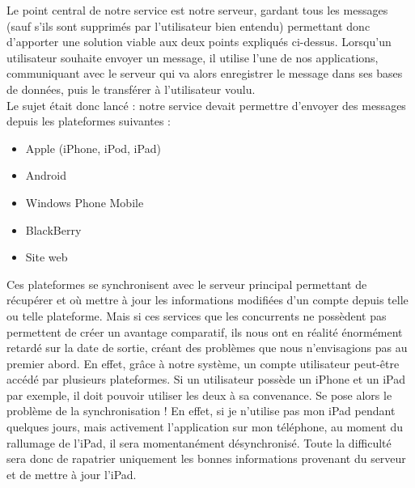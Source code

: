 \documentclass{article}
\begin{document}
Le point central de notre service est notre serveur, gardant tous les messages (sauf s’ils sont supprimés par l’utilisateur bien entendu) permettant donc d’apporter une solution viable aux deux points expliqués ci-dessus. Lorsqu'un utilisateur souhaite envoyer un message, il utilise l'une de nos applications, communiquant avec le serveur qui va alors enregistrer le message dans ses bases de données, puis le transférer à l'utilisateur voulu. \\
	
Le sujet était donc lancé : notre service devait permettre d’envoyer des messages depuis les plateformes suivantes :
	\begin{itemize}
		\item Apple (iPhone, iPod, iPad)
		\item Android
		\item Windows Phone Mobile
		\item BlackBerry
		\item Site web
	\end{itemize}

Ces plateformes se synchronisent avec le serveur principal permettant de récupérer et où mettre à jour les informations modifiées d’un compte depuis telle ou telle plateforme. Mais si ces services que les concurrents ne possèdent pas permettent de créer un avantage comparatif, ils nous ont en réalité énormément retardé sur la date de sortie, créant des problèmes que nous n’envisagions pas au premier abord. En effet, grâce à notre système, un compte utilisateur peut-être accédé par plusieurs plateformes. Si un utilisateur possède un iPhone et un iPad par exemple, il doit pouvoir utiliser les deux à sa convenance.  Se pose alors le problème de la synchronisation ! En effet, si je n’utilise pas mon iPad pendant quelques jours, mais activement l’application sur mon téléphone,  au moment du rallumage de l’iPad, il sera momentanément désynchronisé. Toute la difficulté sera donc de rapatrier uniquement les bonnes informations provenant du serveur et de mettre à jour l’iPad.\\
\end{document}
